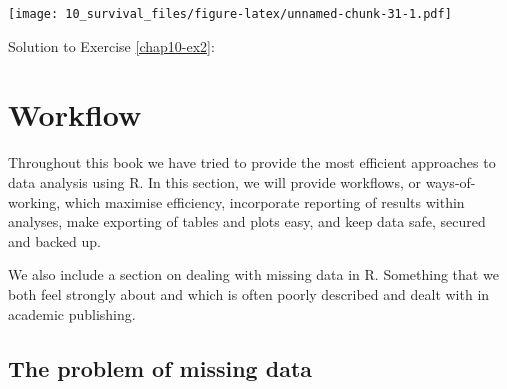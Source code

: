 \documentclass[
  12pt,
  krantz2]{krantz}
\makeatletter
\newenvironment{Shaded}{\begin{snugshade}}{\end{snugshade}}
\newcommand{\CommentTok}[1]{\textcolor[rgb]{0.56,0.35,0.01}{\textit{#1}}}
\newcommand{\DataTypeTok}[1]{\textcolor[rgb]{0.13,0.29,0.53}{#1}}
\newcommand{\DecValTok}[1]{\textcolor[rgb]{0.00,0.00,0.81}{#1}}
\newcommand{\KeywordTok}[1]{\textcolor[rgb]{0.13,0.29,0.53}{\textbf{#1}}}
\newcommand{\NormalTok}[1]{#1}
\newcommand{\OperatorTok}[1]{\textcolor[rgb]{0.81,0.36,0.00}{\textbf{#1}}}
\newcommand{\StringTok}[1]{\textcolor[rgb]{0.31,0.60,0.02}{#1}}
\newenvironment{kframe}{%
\medskip{}
\setlength{\fboxsep}{.8em}
 \def\at@end@of@kframe{}%
 \ifinner\ifhmode%
  \def\at@end@of@kframe{\end{minipage}}%
  \begin{minipage}{\columnwidth}%
 \fi\fi%
 \def\FrameCommand##1{\hskip\@totalleftmargin \hskip-\fboxsep
 \colorbox{shadecolor}{##1}\hskip-\fboxsep
     \hskip-\linewidth \hskip-\@totalleftmargin \hskip\columnwidth}%
 \MakeFramed {\advance\hsize-\width
   \@totalleftmargin\z@ \linewidth\hsize
   \@setminipage}}%
 {\par\unskip\endMakeFramed%
 \at@end@of@kframe}
\renewenvironment{Shaded}{\begin{kframe}}{\end{kframe}}
\makeatother
\begin{document}
\texttt{[image: 10\_survival\_files/figure-latex/unnamed-chunk-31-1.pdf]}

Solution to Exercise \ref{chap10-ex2}:

\begin{Shaded}
\end{Shaded}

\hypertarget{part-workflow}{%
\part{Workflow}\label{part-workflow}}

Throughout this book we have tried to provide the most efficient approaches to data analysis using R.
In this section, we will provide workflows, or ways-of-working, which maximise efficiency, incorporate reporting of results within analyses, make exporting of tables and plots easy, and keep data safe, secured and backed up.

We also include a section on dealing with missing data in R. Something that we both feel strongly about and which is often poorly described and dealt with in academic publishing.

\hypertarget{chap11-h1}{%
\chapter{The problem of missing data}\label{chap11-h1}}

\end{document}
